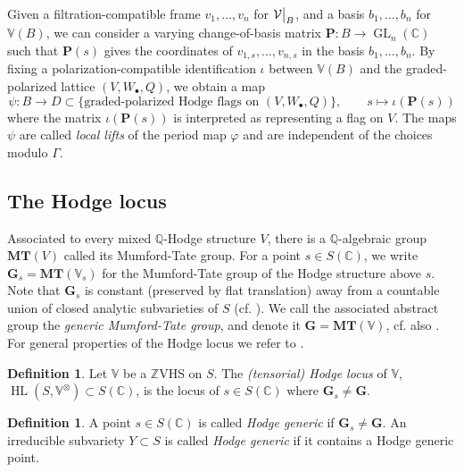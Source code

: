 \documentclass[10pt]{article}
\numberwithin{equation}{section}
\theoremstyle{plain}
\theoremstyle{definition}
\newtheorem{defn}[thm]{Definition}
\theoremstyle{remark}
\newcommand\restr[2]{{
	\left.\kern-\nulldelimiterspace
	#1
	\vphantom{\big|}
	\right|_{#2}
	}}
\newcommand{\HL}{\operatorname{HL}}
\newcommand{\MT}{\mathbf{MT}}
\newcommand{\GL}{\operatorname{GL}}
\newcommand{\C}{\mathbb{C}}
\newcommand{\Q}{\mathbb{Q}}
\newcommand{\Z}{\mathbb{Z}}
\newcommand{\V}{\mathbb{V}}
\begin{document}
\noindent Given a filtration-compatible frame $v_{1}, \hdots, v_{n}$ for $\restr{\mathcal{V}}{B}$, and a basis $b_{1}, \hdots, b_{n}$ for $\V(B)$, we can consider a varying change-of-basis matrix $\mathbf{P} : B \to \GL_{n}(\mathbb{C})$ such that $\mathbf{P}(s)$ gives the coordinates of $v_{1,s}, \hdots, v_{n,s}$ in the basis $b_{1}, \hdots, b_{n}$. By fixing a polarization-compatible identification $\iota$ between $\V(B)$ and the graded-polarized lattice $(V, W_{\bullet}, Q)$, we obtain a map 
\begin{equation}
\label{psidef}
\psi : B \to D \subset \{ \textrm{graded-polarized Hodge flags on }(V, W_{\bullet}, Q) \}, \hspace{2em} s \mapsto \iota(\mathbf{P}(s))
\end{equation}
where the matrix $\iota(\mathbf{P}(s))$ is interpreted as representing a flag on $V$. The maps $\psi$ are called \emph{local lifts} of the period map $\varphi$ and are independent of the choices modulo $\Gamma$.

\subsection{The Hodge locus}

Associated to every mixed $\Q$-Hodge structure $V$, there is a $\mathbb{Q}$-algebraic group $\MT(V)$ called its Mumford-Tate group. For a point $s \in S(\mathbb{C})$, we write $\mathbf{G}_s=\MT(\V_s)$ for the Mumford-Tate group of the Hodge structure above $s$. Note that $\mathbf{G}_s$ is constant (preserved by flat translation) away from a countable union of closed analytic subvarieties of $S$ (cf. \cite[Lem. 4]{MR1154159}). We call the associated abstract group the \emph{generic Mumford-Tate group}, and denote it $\mathbf{G}=\MT(\V)$, cf. also \cite[Def. 4.4]{2024arXiv240616628B}. For general properties of the Hodge locus we refer to \cite[\S4.2]{2024arXiv240616628B}.
\begin{defn}
Let $\V$ be a $\Z$VHS on $S$. The \emph{(tensorial) Hodge locus} of $\V$, $\HL(S,\V^\otimes) \subset S(\mathbb{C})$, is the locus of $s \in S(\mathbb{C})$ where $\mathbf{G}_s \neq \mathbf{G}$.
\end{defn}

\begin{defn}\label{hodgegen}
 A point $s\in S(\C)$ is called \emph{Hodge generic} if $\mathbf{G}_s \neq \mathbf{G}$. An irreducible subvariety $Y\subset S$ is called \emph{Hodge generic} if it contains a Hodge generic point.
\end{defn}
\end{document}
